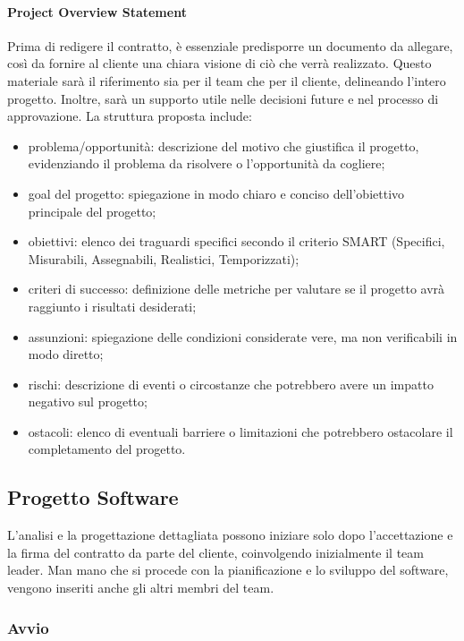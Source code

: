         \paragraph{Project Overview Statement}
        Prima di redigere il contratto, è essenziale predisporre un documento da allegare, così da fornire al cliente una chiara
        visione di ciò che verrà realizzato. Questo materiale sarà il riferimento sia per il team che per il cliente, delineando
        l’intero progetto. Inoltre, sarà un supporto utile nelle decisioni future e nel processo di approvazione. La struttura proposta include:
        \begin{itemize}
            \item problema/opportunità: descrizione del motivo che giustifica il progetto, evidenziando il problema da risolvere o l'opportunità da cogliere;
            \item goal del progetto: spiegazione in modo chiaro e conciso dell'obiettivo principale del progetto;
            \item obiettivi: elenco dei traguardi specifici secondo il criterio SMART (Specifici, Misurabili, Assegnabili, Realistici, Temporizzati);
            \item criteri di successo: definizione delle metriche per valutare se il progetto avrà raggiunto i risultati desiderati;
            \item assunzioni: spiegazione delle condizioni considerate vere, ma non verificabili in modo diretto;
            \item rischi: descrizione di eventi o circostanze che potrebbero avere un impatto negativo sul progetto;
            \item ostacoli: elenco di eventuali barriere o limitazioni che potrebbero ostacolare il completamento del progetto.
        \end{itemize}

    \subsection{Progetto Software}
    L'analisi e la progettazione dettagliata possono iniziare solo dopo l'accettazione e la firma del contratto da parte
    del cliente, coinvolgendo inizialmente il team leader. Man mano che si procede con la pianificazione e lo sviluppo
    del software, vengono inseriti anche gli altri membri del team.

        \subsubsection{Avvio}
